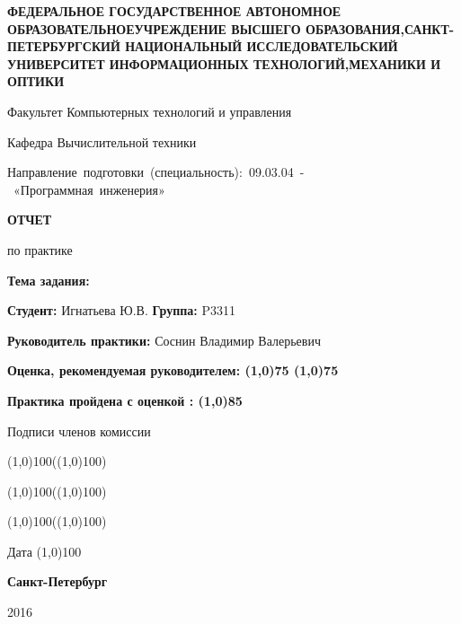 \begin{titlepage}

\begin{center}   
{\bfseries  
ФЕДЕРАЛЬНОЕ ГОСУДАРСТВЕННОЕ АВТОНОМНОЕ ОБРАЗОВАТЕЛЬНОЕУЧРЕЖДЕНИЕ ВЫСШЕГО ОБРАЗОВАНИЯ,САНКТ-ПЕТЕРБУРГСКИЙ НАЦИОНАЛЬНЫЙ ИССЛЕДОВАТЕЛЬСКИЙ УНИВЕРСИТЕТ ИНФОРМАЦИОННЫХ ТЕХНОЛОГИЙ,МЕХАНИКИ И ОПТИКИ
\par\smallskip
Факультет Компьютерных технологий и управления
\par\smallskip
Кафедра Вычислительной техники\\
}
\par\smallskip
\mbox{Направление подготовки (специальность): 09.03.04 - «Программная инженерия»}

\vspace{3cm} 
{\bfseries
ОТЧЕТ 
\par\medskip
по практике
}
\end{center}  

\par\noindent \smallskip
{\bfseries Тема задания:}
\par\noindent \smallskip
{\bfseries Студент: } Игнатьева Ю.В. {\bfseries Группа: } P3311
\par\noindent \smallskip
{\bfseries Руководитель практики: } Соснин Владимир Валерьевич
\par\noindent \smallskip
{\bfseries Оценка, рекомендуемая руководителем: \line(1,0){75} \quad \line(1,0){75}}
\vspace{1cm}

\parindent=8cm
{\bfseries Практика пройдена с оценкой : \line(1,0){85} \par \bigskip
Подписи членов комиссии \par \bigskip

\begin{flushright}  
\line(1,0){100}(\line(1,0){100}) \par \bigskip
\line(1,0){100}(\line(1,0){100}) \par \bigskip
\line(1,0){100}(\line(1,0){100}) \par \bigskip
\end{flushright} 

\parindent=8cm
Дата \line(1,0){100} }
\vspace{\fill}
\begin{center}  
\bfseries Санкт-Петербург \par 2016
\end{center} 

\end{titlepage}